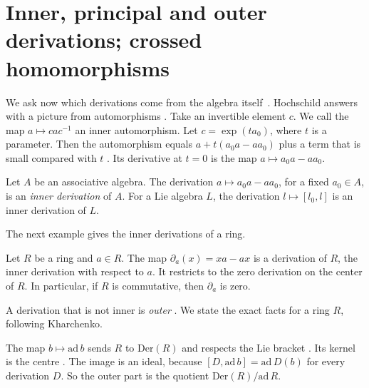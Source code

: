 \section{Inner, principal and outer derivations; crossed homomorphisms}\label{sec:basic-theory:inner-outer}

We ask now which derivations come from the algebra itself~\cite[pp.~678--679]{Hochschild1942}. Hochschild answers
with a picture from automorphisms \cite[p.~678]{Hochschild1942}. Take an
invertible element $c$. We call the map $a \mapsto cac^{-1}$ an inner
automorphism. Let $c = \exp(ta_0)$, where $t$ is a parameter. Then the
automorphism equals $a + t(a_0a - aa_0)$ plus a term that is small compared
with $t$ \cite[pp.~678--679]{Hochschild1942}. Its derivative at $t=0$ is the
map $a \mapsto a_0a - aa_0$.

\begin{definition}\label{def:basic:inner}
Let $A$ be an associative algebra. The derivation $a \mapsto a_0a - aa_0$,
for a fixed $a_0 \in A$, is an \emph{inner derivation} of $A$. For a Lie
algebra $L$, the derivation $l \mapsto [l_0,l]$ is an inner derivation of $L$.
\end{definition}

The next example gives the inner derivations of a ring.

\begin{example}\label{ex:basic:inner}
Let $R$ be a ring and $a\in R$. The map $\partial_a(x)=xa-ax$ is a derivation of
$R$, the inner derivation with respect to $a$. It restricts to the zero
derivation on the center of $R$. In particular, if $R$ is commutative, then
$\partial_a$ is zero.
\end{example}

A derivation that is not inner is \emph{outer}
\cite[pp.~9--10]{Kharchenko1991}. We state the exact facts for a ring $R$,
following Kharchenko.

The map $b \mapsto \mathrm{ad}\,b$ sends $R$ to $\mathrm{Der}(R)$ and respects
the Lie bracket \cite[pp.~9--10]{Kharchenko1991}. Its kernel is the centre
\cite[pp.~9--10]{Kharchenko1991}. The image is an ideal, because
$[D,\mathrm{ad}\,b] = \mathrm{ad}\,D(b)$ for every derivation $D$. So the
outer part is the quotient $\mathrm{Der}(R)/\mathrm{ad}\,R$.


